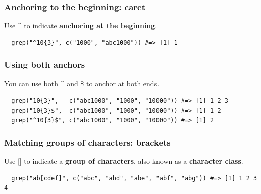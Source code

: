 \documentclass{beamer}
\begin{document}
\begin{frame}[fragile]
  \frametitle{Anchoring to the beginning: caret}
  Use \^{} to indicate \textbf{anchoring at the beginning}.
  \vspace{3mm}

\begin{verbatim}
  grep("^10{3}", c("1000", "abc1000")) #=> [1] 1
\end{verbatim}
\end{frame}
\begin{frame}[fragile]
  \frametitle{Using both anchors}
  You can use both \^{} and \$ to anchor at both ends.
  \vspace{3mm}

\begin{verbatim}
  grep("10{3}",   c("abc1000", "1000", "10000")) #=> [1] 1 2 3
  grep("10{3}$",  c("abc1000", "1000", "10000")) #=> [1] 1 2
  grep("^10{3}$", c("abc1000", "1000", "10000")) #=> [1] 2
\end{verbatim}
\end{frame}
\begin{frame}[fragile]
  \frametitle{Matching groups of characters: brackets}
  Use [] to indicate a \textbf{group of characters}, also known as a \textbf{character class}.
  \vspace{3mm}

\begin{verbatim}
  grep("ab[cdef]", c("abc", "abd", "abe", "abf", "abg")) #=> [1] 1 2 3 4
\end{verbatim}
\end{frame}
\end{document}
